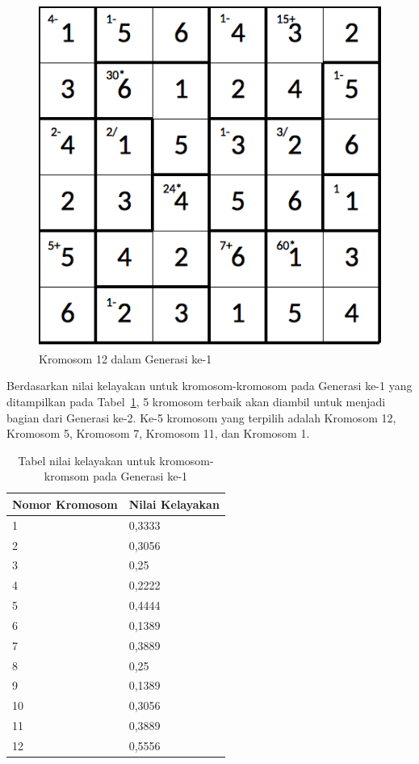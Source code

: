 \begin{figure}
\centering
\captionsetup{justification=centering}
\includegraphics[scale=0.333]{Gambar/hybridgenetic/Generation1Chromosome12}
\caption[Kromosom 12 dalam Generasi ke-1]{Kromosom 12 dalam Generasi ke-1}
\label{fig:analisisg1k12}
\end{figure}

\clearpage

Berdasarkan nilai kelayakan untuk kromosom-kromosom pada Generasi ke-1 yang ditampilkan pada Tabel~\ref{tab:analisishg2}, 5 kromosom terbaik akan diambil untuk menjadi bagian dari Generasi ke-2. Ke-5 kromosom yang terpilih adalah Kromosom 12, Kromosom 5, Kromosom 7, Kromosom 11, dan Kromosom 1.

\begin{table}
\centering
\captionsetup{justification=centering}
\caption[Tabel nilai kelayakan untuk kromosom-kromsom pada Generasi ke-1]{Tabel nilai kelayakan untuk kromosom-kromsom pada Generasi ke-1}
\begin{tabular}{| l | l |}
\hline
Nomor Kromosom & Nilai Kelayakan \\
\hline \hline
1 & 0,3333 \\
\hline
2 & 0,3056 \\
\hline
3 & 0,25 \\
\hline
4 & 0,2222 \\
\hline
5 & 0,4444 \\
\hline
6 & 0,1389 \\
\hline
7 & 0,3889 \\
\hline
8 & 0,25 \\
\hline
9 & 0,1389 \\
\hline
10 & 0,3056 \\
\hline
11 & 0,3889 \\
\hline
12 & 0,5556 \\
\hline
\end{tabular}
\label{tab:analisishg2}
\end{table}

